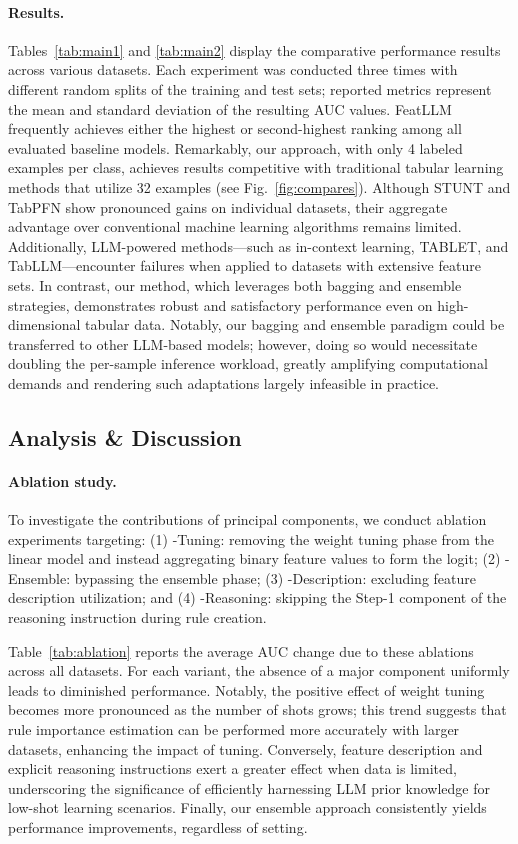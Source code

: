 \vspace*{-0.12in}
\paragraph{Results.}
Tables~\ref{tab:main1} and \ref{tab:main2} display the comparative performance results across various datasets. Each experiment was conducted three times with different random splits of the training and test sets; reported metrics represent the mean and standard deviation of the resulting AUC values. \textsf{FeatLLM} frequently achieves either the highest or second-highest ranking among all evaluated baseline models. Remarkably, our approach, with only 4 labeled examples per class, achieves results competitive with traditional tabular learning methods that utilize 32 examples (see Fig.~\ref{fig:compares}). Although STUNT and TabPFN show pronounced gains on individual datasets, their aggregate advantage over conventional machine learning algorithms remains limited. Additionally, LLM-powered methods—such as in-context learning, TABLET, and TabLLM—encounter failures when applied to datasets with extensive feature sets. In contrast, our method, which leverages both bagging and ensemble strategies, demonstrates robust and satisfactory performance even on high-dimensional tabular data. Notably, our bagging and ensemble paradigm could be transferred to other LLM-based models; however, doing so would necessitate doubling the per-sample inference workload, greatly amplifying computational demands and rendering such adaptations largely infeasible in practice.

\subsection{Analysis \& Discussion}
\label{sec:analysis}
\paragraph{Ablation study.} To investigate the contributions of principal components, we conduct ablation experiments targeting: (1) \textsf{-Tuning}: removing the weight tuning phase from the linear model and instead aggregating binary feature values to form the logit; (2) \textsf{-Ensemble}: bypassing the ensemble phase; (3) \textsf{-Description}: excluding feature description utilization; and (4) \textsf{-Reasoning}: skipping the Step-1 component of the reasoning instruction during rule creation.

Table~\ref{tab:ablation} reports the average AUC change due to these ablations across all datasets. For each variant, the absence of a major component uniformly leads to diminished performance. Notably, the positive effect of weight tuning becomes more pronounced as the number of shots grows; this trend suggests that rule importance estimation can be performed more accurately with larger datasets, enhancing the impact of tuning. Conversely, feature description and explicit reasoning instructions exert a greater effect when data is limited, underscoring the significance of efficiently harnessing LLM prior knowledge for low-shot learning scenarios. Finally, our ensemble approach consistently yields performance improvements, regardless of setting.

